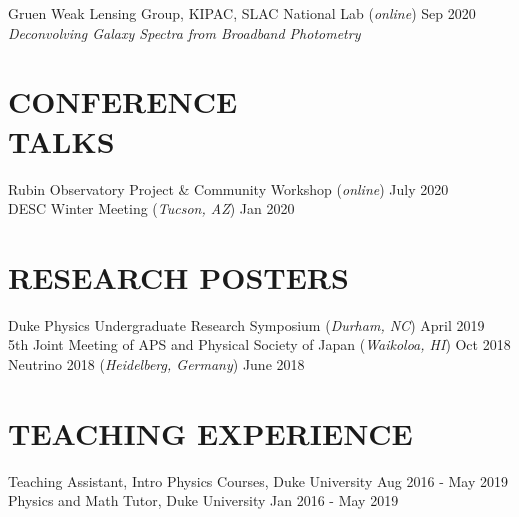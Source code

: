 \documentclass[margin]{res}
\begin{document}
\begin{resume}
Gruen Weak Lensing Group, KIPAC, SLAC National Lab (\textit{online}) \hfill Sep 2020 \\
\textit{Deconvolving Galaxy Spectra from Broadband Photometry} \\

\section{\normalfont CONFERENCE \\TALKS}

Rubin Observatory Project \& Community Workshop (\textit{online}) \hfill July 2020 \\
DESC Winter Meeting (\textit{Tucson, AZ}) \hfill Jan 2020 \\

\section{\normalfont RESEARCH POSTERS}

Duke Physics Undergraduate Research Symposium (\textit{Durham, NC}) \hfill April 2019 \\
5th Joint Meeting of APS and Physical Society of Japan (\textit{Waikoloa, HI}) \hfill Oct 2018 \\
Neutrino 2018 (\textit{Heidelberg, Germany}) \hfill June 2018 \\

\section{\normalfont TEACHING EXPERIENCE}

Teaching Assistant, Intro Physics Courses, Duke University \hfill Aug 2016 - May 2019 \\
Physics and Math Tutor, Duke University \hfill Jan 2016 - May 2019 \\



\end{resume}
\end{document}
